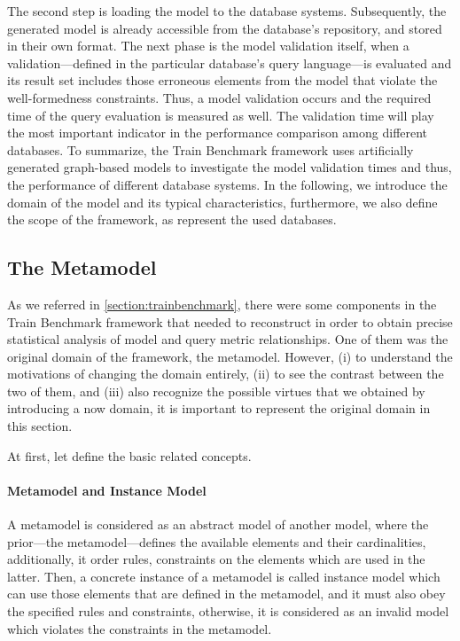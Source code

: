 The second step is loading the model to the database systems. Subsequently, the generated model is already accessible from the database's repository, and stored in their own format. The next phase is the model validation itself, when a validation---defined in the particular database's query language---is evaluated and its result set includes those erroneous elements from the model that violate the well-formedness constraints. Thus, a model validation occurs and the required time of the query evaluation is measured as well. The validation time will play the most important indicator in the performance comparison among different databases.
To summarize, the Train Benchmark framework uses artificially generated graph-based models to investigate the model validation times and thus, the performance of different database systems. In the following, we introduce the domain of the model and its typical characteristics, furthermore, we also define the scope of the framework, as represent the used databases.

\subsection{The Metamodel} \label{section:metamodel}

As we referred in \ref{section:trainbenchmark}, there were some components in the Train Benchmark framework that needed to reconstruct in order to obtain precise statistical analysis of model and query metric relationships. One of them was the original domain of the framework, the metamodel. However, (i) to understand the motivations of changing the domain entirely, (ii) to see the contrast between the two of them, and (iii) also recognize the possible virtues that we obtained by introducing a now domain, it is important to represent the original domain in this section.

At first, let define the basic related concepts.

\paragraph{Metamodel and Instance Model}

A metamodel is considered as an abstract model of another model, where the prior---the metamodel---defines the available elements and their cardinalities, additionally, it order rules, constraints on the elements which are used in the latter. Then, a concrete instance of a metamodel is called instance model which can use those elements that are defined in the metamodel, and it must also obey the specified rules and constraints, otherwise, it is considered as an invalid model which violates the constraints in the metamodel.

